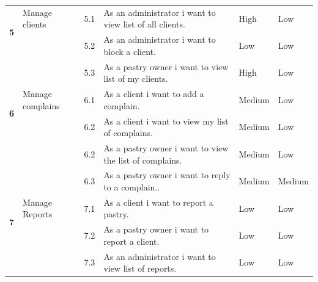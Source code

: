 \documentclass[12pt,a4paper]{report}
\begin{document}
\begin{table}[H]
\begin{center}
\begin{tabular}{|  p{1cm}|  p{4cm}|  p{1cm}| p{5cm}|  p{2cm}| p{2cm}|}
				\\ \hline
				\multirow{2}{*}{\textbf{5} }
				&                        
				Manage clients &                        
				5.1 &                        
				As an administrator i want to view list of all clients.&                        
				High &                        
				Low
				\\
				\cline{3-6}
				&                        
				&                        
				5.2 &                        
				As an administrator i want to block a client.&                        
				Low &                        
				Low
				\\
				\cline{3-6}
				&                        
				&                        
				5.3 &                        
				As a pastry owner i want to view list of my clients.&                        
				High &                        
				Low
				\\
				\hline
				\multirow{2}{*}{\textbf{6} }
				&                        
				Manage complains &                        
				6.1 &                        
				As a client i want to add a complain.&                        
				Medium &                        
				Low
				\\
				\cline{3-6}
				&                        
				&                        
				6.2 &                        
				As a client i want to view my list of complains.&                        
				Medium &                        
				Low
				\\
				\cline{3-6}
				&                        
				&                        
				6.2 &                        
				As a pastry owner i want to view the list of complains.&                        
				Medium &                        
				Low
				\\
				\cline{3-6}
				&                        
				&                        
				6.3 &                        
				As a pastry owner i want to reply to a complain..&                        
				Medium &                        
				Medium
				
				\\ \hline
					\multirow{2}{*}{\textbf{7} }
					&                        
				Manage Reports &                        
				7.1 &                        
				As a client i want to report a pastry.&                        
				Low &                        
				Low
				\\
				\cline{3-6}
				&                        
				&                        
				7.2 &                        
				As a pastry owner i want to report a client.&                        
				Low &                        
				Low
				\\
				\cline{3-6}
				&                        
				&                        
				7.3 &                        
				As an administrator i want to view list of reports.&                        
				Low &                        
				Low
				

\end{tabular}
\end{center}
\end{table}
\end{document}
